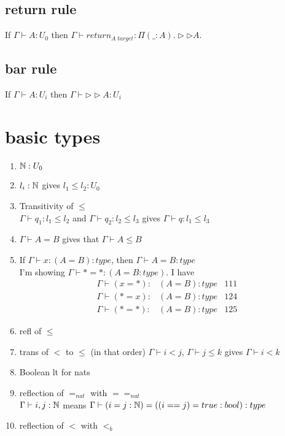 \message{ !name(paper.tex)}\documentclass{article}
\begin{document}
\subsection{return rule}
If $\Gamma \vdash A : U_0$ then $\Gamma \vdash return_{A \; target} : \Pi(\_ : A). \rhd \rhd A$.

\subsection{bar rule}
If $\Gamma \vdash A : U_i$ then
$\Gamma \vdash \rhd \rhd A : U_i$

\section*{basic types}
\begin{enumerate}
    \item $\mathbb{N} : U_0$
    \item $l_i : \mathbb{N}$ gives $l_1 \leq l_2 : U_0$
    \item Transitivity of $\leq$\\
    $\Gamma \vdash q_1: l_1 \leq l_2$ and 
    $\Gamma \vdash q_2: l_2 \leq l_3$ gives
     $\Gamma \vdash q: l_1 \leq l_3$
     \item $\Gamma \vdash A = B$ gives that $\Gamma \vdash A \leq B$
     \item If $\Gamma \vdash x: (A = B): type$, then $\Gamma \vdash A = B : type$\\
     I'm showing $\Gamma \vdash * = * : (A = B : type)$. I have
     \begin{align}
         \Gamma \vdash (x = *):& (A = B) : type &\text{111}\\
          \Gamma \vdash (* = x):& (A = B) : type &\text{124}\\
           \Gamma \vdash (* = *):& (A = B) : type &\text{125}
     \end{align}
      \item refl of $\leq$
      \item trans of $<$ to $\leq$ (in that order)
      $\Gamma \vdash  i < j$, $\Gamma \vdash j \leq k$ gives $\Gamma \vdash i < k$
      \item Boolean lt for nats
      \item reflection of $=_{nat}$ with $==_{nat}$\\
      $\Gamma \vdash i, j : \mathbb{N}$ means $\Gamma \vdash (i = j : \mathbb{N}) = ((i == j) = true : bool) : type$
      \item reflection of $<$ with $<_b$\\

\end{enumerate}
\end{document}

